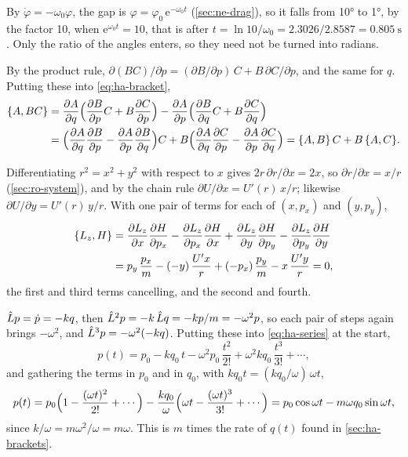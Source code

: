 By $\dot\varphi = -\omega_0\varphi$, the gap is
$\varphi = \varphi_0\,\mathrm{e}^{-\omega_0t}$ (\cref{sec:ne-drag}), so it
falls from \ang{10} to \ang{1}, by the factor 10, when
$\mathrm{e}^{\omega_0t} = 10$, that is after $t = \ln 10/\omega_0 =
2.3026/2.8587 = \SI{0.805}{\second}$. Only the ratio of the angles enters,
so they need not be turned into radians.

By the product rule, $\partial(BC)/\partial p =
(\partial B/\partial p)\,C + B\,\partial C/\partial p$, and the same for
$q$. Putting these into \cref{eq:ha-bracket},
\begin{align*}
   \{A, BC\} &= \frac{\partial A}{\partial q}\Bigl(\frac{\partial B}
   {\partial p}C + B\frac{\partial C}{\partial p}\Bigr)
   - \frac{\partial A}{\partial p}\Bigl(\frac{\partial B}{\partial q}C
   + B\frac{\partial C}{\partial q}\Bigr)\\
   &= \Bigl(\frac{\partial A}{\partial q}\frac{\partial B}{\partial p}
   - \frac{\partial A}{\partial p}\frac{\partial B}{\partial q}\Bigr)C
   + B\Bigl(\frac{\partial A}{\partial q}\frac{\partial C}{\partial p}
   - \frac{\partial A}{\partial p}\frac{\partial C}{\partial q}\Bigr)
   = \{A, B\}\,C + B\,\{A, C\} .
\end{align*}

Differentiating $r^2 = x^2 + y^2$ with respect to
$x$ gives $2r\,\partial r/\partial x = 2x$, so $\partial r/\partial x =
x/r$ (\cref{sec:ro-system}), and by the chain rule $\partial U/\partial x
= U'(r)\,x/r$; likewise $\partial U/\partial y = U'(r)\,y/r$. With one pair of terms for each of $(x, p_x)$ and $(y, p_y)$,
\begin{align*}
   \{L_z, H\} &= \frac{\partial L_z}{\partial x}\frac{\partial H}
   {\partial p_x} - \frac{\partial L_z}{\partial p_x}\frac{\partial H}
   {\partial x} + \frac{\partial L_z}{\partial y}\frac{\partial H}
   {\partial p_y} - \frac{\partial L_z}{\partial p_y}\frac{\partial H}
   {\partial y}\\
   &= p_y\,\frac{p_x}{m} - (-y)\,\frac{U'x}{r} + (-p_x)\,\frac{p_y}{m}
   - x\,\frac{U'y}{r} = 0 ,
\end{align*}
the first and third terms cancelling, and the second and fourth.

$\hat{L} p = \dot{p} = -kq$, then $\hat{L}^2p = -k\,
\hat{L} q = -kp/m = -\omega^2p$, so each pair of steps again brings
$-\omega^2$, and $\hat{L}^3p = -\omega^2(-kq)$. Putting these into
\cref{eq:ha-series} at the start,
\begin{equation*}
   p(t) = p_0 - kq_0\,t - \omega^2p_0\,\frac{t^2}{2!}
   + \omega^2kq_0\,\frac{t^3}{3!} + \dotsb ,
\end{equation*}
and gathering the terms in $p_0$ and in $q_0$, with $kq_0t =
(kq_0/\omega)\,\omega t$,
\begin{equation*}
   p(t) = p_0\Bigl(1 - \frac{(\omega t)^2}{2!} + \dotsb\Bigr)
   - \frac{kq_0}{\omega}\Bigl(\omega t - \frac{(\omega t)^3}{3!}
   + \dotsb\Bigr)
   = p_0\cos\omega t - m\omega q_0\sin\omega t ,
\end{equation*}
since $k/\omega = m\omega^2/\omega = m\omega$. This is $m$ times the rate
of $q(t)$ found in \cref{sec:ha-brackets}.


